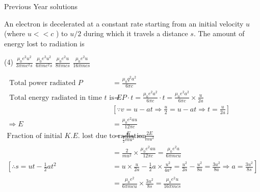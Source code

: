 \newpage
\begin{abox}
	Previous Year solutions
\end{abox}
\begin{enumerate}
	\begin{minipage}{\textwidth}
		\item An electron is decelerated at a constant rate starting from an initial velocity $u$ (where $u<<c$ ) to $u / 2$ during which it travels a distance $s$. The amount of energy lost to radiation is
	\end{minipage}
	\begin{tasks}(4)
		\task[\textbf{A.}] $\frac{\mu_{0} e^{2} u^{2}}{3 \pi m c^{2} s}$
		\task[\textbf{B.}]$\frac{\mu_{0} e^{2} u^{2}}{6 \pi m c^{2} s}$
		\task[\textbf{C.}]$\frac{\mu_{0} e^{2} u}{8 \pi m c s}$
		\task[\textbf{D.}]$\frac{\mu_{0} e^{2} u}{16 \pi m c s}$
	\end{tasks}
	\begin{answer}
		\begin{align*}
		\text { Total power radiated } P&=\frac{\mu_{0} q^{2} a^{2}}{6 \pi c}\\
		\text { Total energy radiated in time } t \text { is } E&=P \cdot t=\frac{\mu_{0} e^{2} a^{2}}{6 \pi c} \cdot t=\frac{\mu_{0} e^{2} a^{2}}{6 \pi c} \times \frac{u}{2 a}\\
		&{\left[\because v=u-a t \Rightarrow \frac{u}{2}=u-a t \Rightarrow t=\frac{u}{2 a}\right]} \\
		\Rightarrow E&=\frac{\mu_{0} e^{2} a u}{12 \pi c}\\
		\text{Fraction of initial $K . E .$ lost due to radiation }&=\frac{E}{\frac{1}{2} m u^{2}}=\frac{2 E}{m u^{2}}\\
		&=\frac{2}{m u^{2}} \times \frac{\mu_{0} e^{2} a u}{12 \pi c}=\frac{\mu_{0} e^{2} a}{6 \pi m c u} \\
		\left[\therefore s=u t-\frac{1}{2} a t^{2}\right. &\left. =u \times \frac{u}{2 a}-\frac{1}{2} a \times \frac{u^{2}}{4 a^{2}}=\frac{u^{2}}{2 a}-\frac{u^{2}}{8 a}=\frac{3 u^{2}}{8 a} \Rightarrow a=\frac{3 u^{2}}{8 s}\right] \\
		&=\frac{\mu_{0} e^{2}}{6 \pi m c u} \times \frac{3 u^{2}}{8 s}=\frac{\mu_{0} e^{2} u}{16 \pi m c s}
		\end{align*}
	\end{answer}
\end{enumerate}

 

